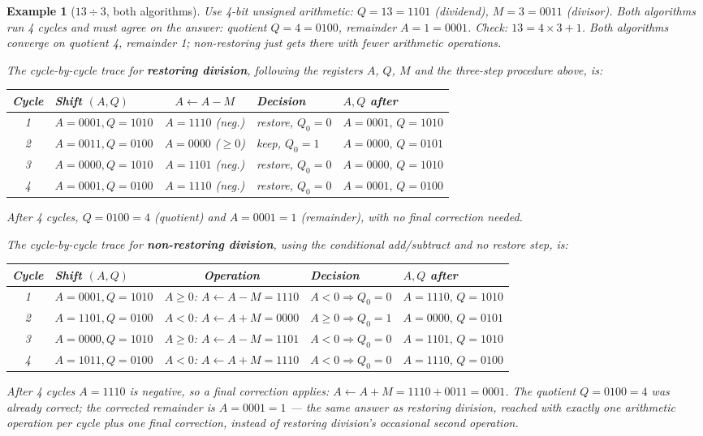 \documentclass[11pt]{article}
\newtheorem{example}{Example}[section]
\begin{document}
\begin{example}[$13 \div 3$, both algorithms]
Use 4-bit unsigned arithmetic: $Q=13=1101$ (dividend), $M=3=0011$ (divisor). Both algorithms run 4 cycles and must agree on the answer: quotient $Q=4=0100$, remainder $A=1=0001$. Check: $13 = 4\times 3 + 1$. Both algorithms converge on quotient 4, remainder 1; non-restoring just gets there with fewer arithmetic operations.

The cycle-by-cycle trace for \textbf{restoring division}, following the registers $A$, $Q$, $M$ and the three-step procedure above, is:
\begin{center}
\small
\begin{tabular}{@{}clcll@{}}
\toprule
Cycle & Shift $(A,Q)$ & $A \gets A-M$ & Decision & $A,Q$ after \\
\midrule
1 & $A{=}0001,Q{=}1010$ & $A=1110$ (neg.) & restore, $Q_0{=}0$ & $A{=}0001,\,Q{=}1010$ \\
2 & $A{=}0011,Q{=}0100$ & $A=0000$ ($\ge0$) & keep, $Q_0{=}1$ & $A{=}0000,\,Q{=}0101$ \\
3 & $A{=}0000,Q{=}1010$ & $A=1101$ (neg.) & restore, $Q_0{=}0$ & $A{=}0000,\,Q{=}1010$ \\
4 & $A{=}0001,Q{=}0100$ & $A=1110$ (neg.) & restore, $Q_0{=}0$ & $A{=}0001,\,Q{=}0100$ \\
\bottomrule
\end{tabular}
\end{center}
After 4 cycles, $Q=0100=4$ (quotient) and $A=0001=1$ (remainder), with no final correction needed.

The cycle-by-cycle trace for \textbf{non-restoring division}, using the conditional add/subtract and no restore step, is:
\begin{center}
\small
\begin{tabular}{@{}clcll@{}}
\toprule
Cycle & Shift $(A,Q)$ & Operation & Decision & $A,Q$ after \\
\midrule
1 & $A{=}0001,Q{=}1010$ & $A{\ge}0$: $A\gets A-M=1110$ & $A{<}0\Rightarrow Q_0{=}0$ & $A{=}1110,\,Q{=}1010$ \\
2 & $A{=}1101,Q{=}0100$ & $A{<}0$: $A\gets A+M=0000$ & $A{\ge}0\Rightarrow Q_0{=}1$ & $A{=}0000,\,Q{=}0101$ \\
3 & $A{=}0000,Q{=}1010$ & $A{\ge}0$: $A\gets A-M=1101$ & $A{<}0\Rightarrow Q_0{=}0$ & $A{=}1101,\,Q{=}1010$ \\
4 & $A{=}1011,Q{=}0100$ & $A{<}0$: $A\gets A+M=1110$ & $A{<}0\Rightarrow Q_0{=}0$ & $A{=}1110,\,Q{=}0100$ \\
\bottomrule
\end{tabular}
\end{center}
After 4 cycles $A=1110$ is negative, so a final correction applies: $A \gets A+M = 1110+0011=0001$. The quotient $Q=0100=4$ was already correct; the corrected remainder is $A=0001=1$ --- the same answer as restoring division, reached with exactly one arithmetic operation per cycle plus one final correction, instead of restoring division's occasional second operation.
\end{example}
\end{document}
